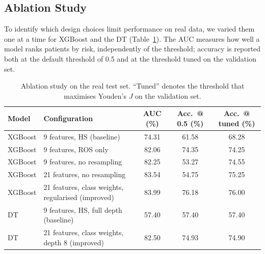 \subsection{Ablation Study}
\label{sec:ablation}

To identify which design choices limit performance on real data, we varied
them one at a time for XGBoost and the DT (Table~\ref{tab:ablation}). The
AUC measures how well a model ranks patients by risk, independently of the
threshold; accuracy is reported both at the default threshold of 0.5 and at
the threshold tuned on the validation set.

\begin{table}[t]
\centering
\caption{Ablation study on the real test set. ``Tuned'' denotes
the threshold that maximises Youden's $J$ on the validation set.}
\label{tab:ablation}
\small
\begin{tabular}{llccc}
\toprule
Model & Configuration & AUC (\%) & Acc.\ @ 0.5 (\%) & Acc.\ @ tuned (\%) \\
\midrule
XGBoost & 9 features, HS (baseline) & 74.31 & 61.58 & 68.28 \\
XGBoost & 9 features, ROS only & 82.06 & 74.35 & 74.25 \\
XGBoost & 9 features, no resampling & 82.25 & 53.27 & 74.55 \\
XGBoost & 21 features, no resampling & 83.54 & 54.75 & 75.25 \\
XGBoost & 21 features, class weights, regularised (improved) & 83.99 & 76.18 & 76.00 \\
\midrule
DT & 9 features, HS, full depth (baseline) & 57.40 & 57.40 & 57.40 \\
DT & 21 features, class weights, depth 8 (improved) & 82.50 & 74.93 & 74.90 \\
\bottomrule
\end{tabular}
\end{table}

